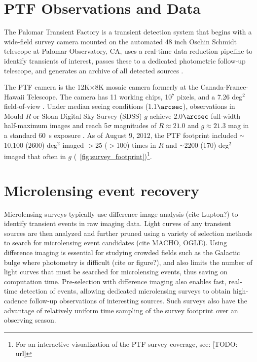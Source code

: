 \documentclass[12pt,preprint]{aastex}
\newcommand{\apwsim}{\raisebox{0.2ex}{\scriptsize$\sim$\normalsize}}
\begin{document}
\section{PTF Observations and Data}
The Palomar Transient Factory is a transient detection system that begins with a wide-field survey camera mounted on the automated 48 inch Oschin Schmidt telescope at Palomar Observatory, CA, uses a real-time data reduction pipeline to identify transients of interest, passes these to a dedicated photometric follow-up telescope, and generates an archive of all detected sources \citep{nick2009,rau2009}.

The PTF camera is the 12K$\times$8K mosaic camera formerly at the Canada-France-Hawaii Telescope. The camera has 11 working chips, 10$^7$ pixels, and a 7.26 deg$^2$ field-of-view \citep{rahmer2008}. Under median seeing conditions (1.1$\arcsec$), observations in Mould $R$ or Sloan Digital Sky Survey (SDSS) $g$ achieve 2.0$\arcsec$ full-width half-maximum images and reach 5$\sigma$ magnitudes of $R \approx 21.0$ and $g \approx 21.3$ mag in a standard 60~s exposure \citep{nick2010}. As of August 9, 2012, the PTF footprint included $\apwsim$10,100 (2600) deg$^2$ imaged $>$25 ($>$100) times in $R$ and $\apwsim$2200 (170) deg$^2$ imaged that often in $g$ (\figurename~\ref{fig:survey_footprint})\footnote{For an interactive visualization of the PTF survey coverage, see: [TODO: url]}.

\section{Microlensing event recovery}
Microlensing surveys typically use difference image analysis (cite Lupton?) to identify transient events in raw imaging data. Light curves of any transient sources are then analyzed and further pruned using a variety of selection methods to search for microlensing event candidates (cite MACHO, OGLE). Using difference imaging is essential for studying crowded fields such as the Galactic bulge where photometry is difficult (cite or figure?), and also limits the number of light curves that must be searched for microlensing events, thus saving on computation time. Pre-selection with difference imaging also enables fast, real-time detection of events, allowing dedicated microlensing surveys to obtain high-cadence follow-up observations of interesting sources. Such surveys also have the advantage of relatively uniform time sampling of the survey footprint over an observing season.
\end{document}
